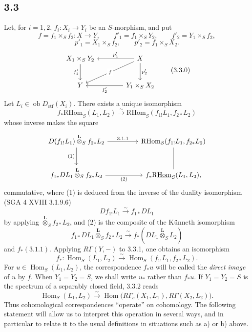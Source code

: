 \documentclass[11pt]{article}
\DeclareMathOperator{\Hom}{Hom}
\newcommand{\ob}{\operatorname{ob}}
\providecommand{\Dctf}{D_{\mathrm{ctf}}}
\providecommand{\Dctf}{D_{\mathrm{ctf}}}
\providecommand{\Hom}{\operatorname{Hom}}
\providecommand{\ob}{\operatorname{ob}}
\providecommand{\Hom}{\operatorname{Hom}}
\begin{document}
\subsection*{3.3}
Let, for $i=1,2$, $f_i:X_i\to Y_i$ be an $S$-morphism, and put
\[
f=f_1\times_S f_2:X\to Y,
\qquad
f'_1=f_1\times_S Y_2,
\qquad
f'_2=Y_1\times_S f_2,
\]
\[
p'_1=X_1\times_S f_2,
\qquad
p'_2=f_1\times_S X_2.
\]
\begin{equation}
\begin{tikzcd}[column sep=3.8em,row sep=2.4em]
X_1\times_S Y_2 \arrow[d,"f'_1"'] & X \arrow[l,"p'_1"'] \arrow[dl,"f" description] \arrow[d,"p'_2"] \\
Y & Y_1\times_S X_2 \arrow[l,"f'_2"]
\end{tikzcd}
\tag{3.3.0}
\end{equation}
Let $L_i\in\ob\Dctf(X_i)$. There exists a unique isomorphism
\begin{equation}
f_*\mathrm{R}\underline{\mathrm{Hom}}_S(L_1,L_2)
\xrightarrow{\sim}
\mathrm{R}\underline{\mathrm{Hom}}_S(f_{1!}L_1,f_{2*}L_2)
\tag{3.3.1}
\end{equation}
whose inverse makes the square
\[
\begin{tikzcd}[column sep=4.5em,row sep=2.6em]
D(f_{1!}L_1)\overset{\mathbf L}{\otimes}_S f_{2*}L_2
  \arrow[r,"3.1.1"] \arrow[d,"(1)"']
& \mathrm{R}\mathrm{Hom}_S(f_{1!}L_1,f_{2*}L_2) \arrow[d,dash] \\
f_{1*}DL_1\overset{\mathbf L}{\otimes}_S f_{2*}L_2
  \arrow[r,"(2)"']
& f_*\mathrm{R}\underline{\mathrm{Hom}}_S(L_1,L_2),
\end{tikzcd}
\]
commutative, where (1) is deduced from the inverse of the duality isomorphism (SGA 4 XVIII 3.1.9.6)
\[
Df_{1!}L_1\xrightarrow{\sim}f_{1*}DL_1
\]
by applying $\overset{\mathbf L}{\otimes}_S f_{2*}L_2$, and (2) is the composite of the Künneth isomorphism
\[
f_{1*}DL_1\overset{\mathbf L}{\otimes}_S f_{2*}L_2
\xrightarrow{\sim}
f_*(DL_1\overset{\mathbf L}{\otimes}_S L_2)
\]
and $f_*(3.1.1)$. Applying $R\Gamma(Y,-)$ to 3.3.1, one obtains an isomorphism
\begin{equation}
f_*:\Hom_S(L_1,L_2)
\xrightarrow{\sim}
\Hom_S(f_{1!}L_1,f_{2*}L_2).
\tag{3.3.2}
\end{equation}
For $u\in\Hom_S(L_1,L_2)$, the correspondence $f_*u$ will be called the \emph{direct image} of $u$ by $f$. When $Y_1=Y_2=S$, we shall write $u_*$ rather than $f_*u$. If $Y_1=Y_2=S$ is the spectrum of a separably closed field, 3.3.2 reads
\begin{equation}
\Hom_S(L_1,L_2)
\xrightarrow{\sim}
\Hom\bigl(R\Gamma_c(X_1,L_1),R\Gamma(X_2,L_2)\bigr).
\tag{3.3.3}
\end{equation}
Thus cohomological correspondences ``operate'' on cohomology. The following statement will allow us to interpret this operation in several ways, and in particular to relate it to the usual definitions in situations such as a) or b) above.
\end{document}
